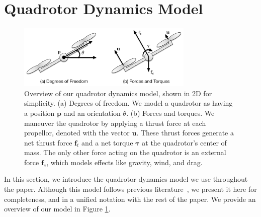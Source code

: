 



\section{Quadrotor Dynamics Model}
\label{sec:model}

\begin{figure}[t]
\centering
\includegraphics[width=3.3in]{images/2016_siggraph/10_model.pdf}
\caption{
Overview of our quadrotor dynamics model, shown in 2D for simplicity.
(a) Degrees of freedom. We model a quadrotor as having a position $\mathbf{p}$ and an orientation $\theta$.
(b) Forces and torques. We maneuver the quadrotor by applying a thrust force at each propellor, denoted with the vector $\mathbf{u}$.
These thrust forces generate a net thrust force $\mathbf{f}_t$ and a net torque $\mathbf{\tau}$ at the quadrotor's center of mass.
The only other force acting on the quadrotor is an external force $\mathbf{f}_e$, which models effects like gravity, wind, and drag.
}
\label{fig:model}
\end{figure}

In this section, we introduce the quadrotor dynamics model we use throughout the paper.
Although this model follows previous literature~\cite{mellinger:2011,joubert:2015}, we present it here for completeness, and in a unified notation with the rest of the paper.
We provide an overview of our model in Figure \ref{fig:model}.


